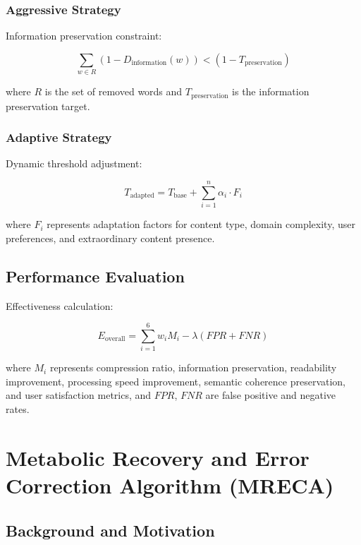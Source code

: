 \documentclass[12pt,a4paper]{article}
\begin{document}
\subsubsection{Aggressive Strategy}

Information preservation constraint:

\begin{equation}
\sum_{w \in R} (1 - D_{\text{information}}(w)) < (1 - T_{\text{preservation}})
\end{equation}

where $R$ is the set of removed words and $T_{\text{preservation}}$ is the information preservation target.

\subsubsection{Adaptive Strategy}

Dynamic threshold adjustment:

\begin{equation}
T_{\text{adapted}} = T_{\text{base}} + \sum_{i=1}^{n} \alpha_i \cdot F_i
\end{equation}

where $F_i$ represents adaptation factors for content type, domain complexity, user preferences, and extraordinary content presence.

\subsection{Performance Evaluation}

Effectiveness calculation:

\begin{equation}
E_{\text{overall}} = \sum_{i=1}^{6} w_i M_i - \lambda(FPR + FNR)
\end{equation}

where $M_i$ represents compression ratio, information preservation, readability improvement, processing speed improvement, semantic coherence preservation, and user satisfaction metrics, and $FPR$, $FNR$ are false positive and negative rates.

\section{Metabolic Recovery and Error Correction Algorithm (MRECA)}

\subsection{Background and Motivation}
\end{document}
